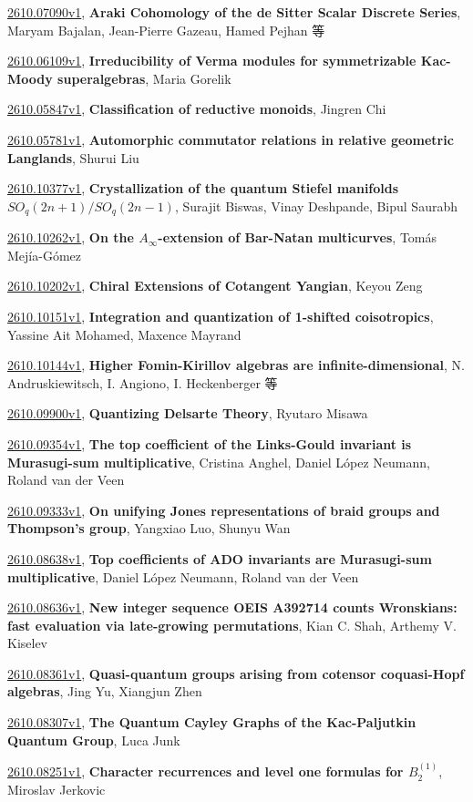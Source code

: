 \documentclass[9pt, a4paper]{article}
\theoremstyle{plain}
\theoremstyle{definition}
\theoremstyle{remark}
\newcommand{\arxiv}[3]{\href{https://arxiv.org/abs/#1}{#1}, \textbf{\textcolor{arxivblue}{#2}}, #3}
\begin{document}
\arxiv{2610.07090v1}{Araki Cohomology of the de Sitter Scalar Discrete Series}{Maryam Bajalan, Jean-Pierre Gazeau, Hamed Pejhan 等}

\arxiv{2610.06109v1}{Irreducibility of Verma modules for symmetrizable Kac-Moody superalgebras}{Maria Gorelik}

\arxiv{2610.05847v1}{Classification of reductive monoids}{Jingren Chi}

\arxiv{2610.05781v1}{Automorphic commutator relations in relative geometric Langlands}{Shurui Liu}

\arxiv{2610.10377v1}{Crystallization of the quantum Stiefel manifolds $SO_q(2n+1)/SO_q(2n-1)$}{Surajit Biswas, Vinay Deshpande, Bipul Saurabh}

\arxiv{2610.10262v1}{On the $A_\infty$-extension of Bar-Natan multicurves}{Tomás Mejía-Gómez}

\arxiv{2610.10202v1}{Chiral Extensions of Cotangent Yangian}{Keyou Zeng}

\arxiv{2610.10151v1}{Integration and quantization of 1-shifted coisotropics}{Yassine Ait Mohamed, Maxence Mayrand}

\arxiv{2610.10144v1}{Higher Fomin-Kirillov algebras are infinite-dimensional}{N. Andruskiewitsch, I. Angiono, I. Heckenberger 等}

\arxiv{2610.09900v1}{Quantizing Delsarte Theory}{Ryutaro Misawa}

\arxiv{2610.09354v1}{The top coefficient of the Links-Gould invariant is Murasugi-sum multiplicative}{Cristina Anghel, Daniel López Neumann, Roland van der Veen}

\arxiv{2610.09333v1}{On unifying Jones representations of braid groups and Thompson's group}{Yangxiao Luo, Shunyu Wan}

\arxiv{2610.08638v1}{Top coefficients of ADO invariants are Murasugi-sum multiplicative}{Daniel López Neumann, Roland van der Veen}

\arxiv{2610.08636v1}{New integer sequence OEIS A392714 counts Wronskians: fast evaluation via late-growing permutations}{Kian C. Shah, Arthemy V. Kiselev}

\arxiv{2610.08361v1}{Quasi-quantum groups arising from cotensor coquasi-Hopf algebras}{Jing Yu, Xiangjun Zhen}

\arxiv{2610.08307v1}{The Quantum Cayley Graphs of the Kac-Paljutkin Quantum Group}{Luca Junk}

\arxiv{2610.08251v1}{Character recurrences and level one formulas for $B_2^{(1)}$}{Miroslav Jerkovic}
\end{document}
